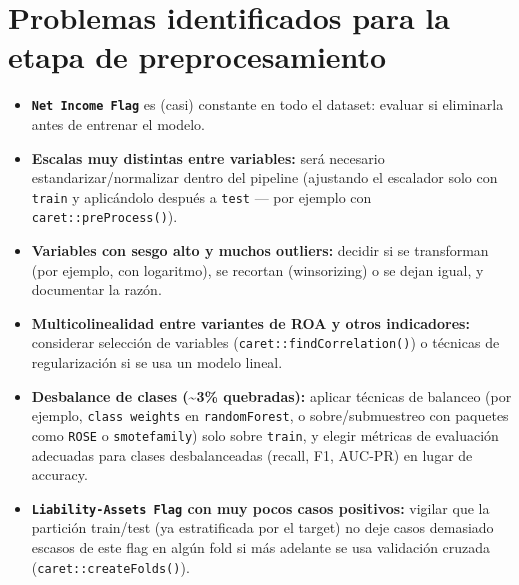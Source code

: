 \documentclass[
]{book}
\providecommand{\tightlist}{%
  \setlength{\itemsep}{0pt}\setlength{\parskip}{0pt}}
\begin{document}
\section{Problemas identificados para la etapa de preprocesamiento}\label{problemas-identificados-para-la-etapa-de-preprocesamiento}

\begin{itemize}
\tightlist
\item
  \textbf{\texttt{Net\ Income\ Flag}} es (casi) constante en todo el dataset: evaluar si eliminarla
  antes de entrenar el modelo.
\item
  \textbf{Escalas muy distintas entre variables:} será necesario estandarizar/normalizar
  dentro del pipeline (ajustando el escalador solo con \texttt{train} y aplicándolo después
  a \texttt{test} --- por ejemplo con \texttt{caret::preProcess()}).
\item
  \textbf{Variables con sesgo alto y muchos outliers:} decidir si se transforman (por
  ejemplo, con logaritmo), se recortan (winsorizing) o se dejan igual, y documentar la
  razón.
\item
  \textbf{Multicolinealidad entre variantes de ROA y otros indicadores:} considerar
  selección de variables (\texttt{caret::findCorrelation()}) o técnicas de regularización si
  se usa un modelo lineal.
\item
  \textbf{Desbalance de clases (\textasciitilde3\% quebradas):} aplicar técnicas de balanceo (por
  ejemplo, \texttt{class\ weights} en \texttt{randomForest}, o sobre/submuestreo con paquetes como
  \texttt{ROSE} o \texttt{smotefamily}) solo sobre \texttt{train}, y elegir métricas de evaluación
  adecuadas para clases desbalanceadas (recall, F1, AUC-PR) en lugar de accuracy.
\item
  \textbf{\texttt{Liability-Assets\ Flag} con muy pocos casos positivos:} vigilar que la partición
  train/test (ya estratificada por el target) no deje casos demasiado escasos de este
  flag en algún fold si más adelante se usa validación cruzada
  (\texttt{caret::createFolds()}).
\end{itemize}


\end{document}
